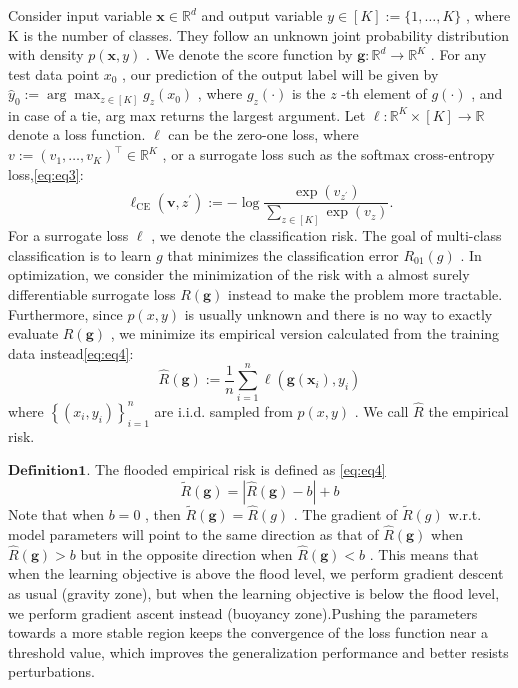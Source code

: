 \documentclass[a4paper,fleqn]{cas-sc}
\begin{document}
Consider input variable  $\boldsymbol{x} \in \mathbb{R}^{d}$  and output variable  $y \in   [K]:=\{1, \ldots, K\}$ , where  K  is the number of classes. They follow an unknown joint probability distribution with density  $p(\boldsymbol{x}, y)$ . We denote the score function by  $\boldsymbol{g}: \mathbb{R}^{d} \rightarrow   \mathbb{R}^{K}$ . For any test data point  $x_{0}$ , our prediction of the output label will be given by  $\widehat{y}_{0}:=\arg \max _{z \in[K]} g_{z}\left(x_{0}\right)$ , where  $g_{z}(\cdot)$  is the  $z$ -th element of  $g(\cdot)$ , and in case of a tie, arg max returns the largest argument. Let  $\ell: \mathbb{R}^{K} \times[K] \rightarrow \mathbb{R}$  denote a loss function.  $\ell$  can be the zero-one loss, where  $v:=\left(v_{1}, \ldots, v_{K}\right)^{\top} \in \mathbb{R}^{K}$ , or a surrogate loss such as the softmax cross-entropy loss,\ref{eq:eq3}:
\begin{equation}
\label{eq:eq3}
\ell_{\mathrm{CE}}\left(\boldsymbol{v}, z^{\prime}\right):=-\log \frac{\exp \left(v_{z^{\prime}}\right)}{\sum_{z \in[K]} \exp \left(v_{z}\right)} .
\end{equation}
For a surrogate loss  $\ell$ , we denote the classification risk.
The goal of multi-class classification is to learn  $g$  that minimizes the classification error  $R_{01}(g)$ . In optimization, we consider the minimization of the risk with a almost surely differentiable surrogate loss  $R(\boldsymbol{g})$  instead to make the problem more tractable. Furthermore, since  $p(x, y)$  is usually unknown and there is no way to exactly evaluate  $R(\boldsymbol{g})$ , we minimize its empirical version calculated from the training data instead\ref{eq:eq4}:
\begin{equation}
\label{eq:eq4}
\widehat{R}(\boldsymbol{g}):=\frac{1}{n} \sum_{i=1}^{n} \ell\left(\boldsymbol{g}\left(\boldsymbol{x}_{i}\right), y_{i}\right)
\end{equation}
where  $\left\{\left(x_{i}, y_{i}\right)\right\}_{i=1}^{n}$  are i.i.d. sampled from  $p(x, y)$ . We call  $\widehat{R}$  the empirical risk.

$\mathbf{Definition 1.}$ The flooded empirical risk is defined  as \ref{eq:eq4} 
\begin{equation}
\widetilde{R}(\boldsymbol{g})=|\widehat{R}(\boldsymbol{g})-b|+b
\end{equation}
Note that when  $b=0$ , then  $\widetilde{R}(\boldsymbol{g})=\widehat{R}(g)$ . The gradient of  $\widetilde{R}(g)$  w.r.t. model parameters will point to the same direction as that of  $\widehat{R}(\boldsymbol{g})$  when  $\widehat{R}(\boldsymbol{g})>b$  but in the opposite direction when  $\widehat{R}(\boldsymbol{g})<b$ . This means that when the learning objective is above the flood level, we perform gradient descent as usual (gravity zone), but when the learning objective is below the flood level, we perform gradient ascent instead (buoyancy zone).Pushing the parameters towards a more stable region keeps the convergence of the loss function near a threshold value, which improves the generalization performance and better resists perturbations.
%
\end{document}
